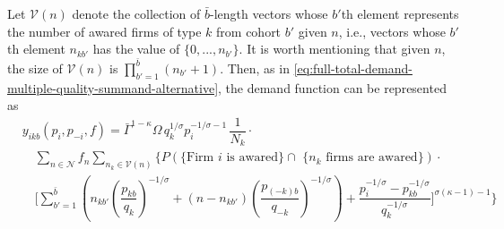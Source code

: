 \documentclass[12pt]{article}
\begin{document}
Let $\mathcal{V} (n)$ denote the collection of $\bar b$-length vectors whose $b'$th element represents the number of awared firms of type $k$ from cohort $b'$ given $n$, i.e., vectors whose $b'$th element $n_{kb'}$ has the value of $\{0,..., n_{b'} \}$. It is worth mentioning that given $n$, the size of $\mathcal{V} (n)$ is $\prod_{b'=1}^{\bar b} (n_{b'} + 1)$. Then, as in \eqref{eq:full-total-demand-multiple-quality-summand-alternative}, the demand function can be represented as
\begin{equation}\label{eq:full-total-demand-two-quality-multiple-cohort}
\begin{aligned}
& y_{ikb}(p_i, p_{-i}, f) 
=  \bar{\Gamma}^{1-\kappa}\Omega \, q_k^{1/\sigma}p_i^{-1/\sigma - 1}\, \dfrac{1}{N_k} \cdot  \\ 
& \quad \sum_{n \in \mathcal{N} } f_n   \sum_{n_k \in \mathcal{V} (n) }  
\Bigg\{
P( \text{\{Firm $i$ is awared\} $\cap$ \{$n_k$ firms are awared\}})
\cdot \\ & \quad
\Bigg[
\sum_{b' = 1}^{\bar b} 
\left(
n_{kb'} \left( \dfrac{p_{kb}}{q_{k}}   \right)^{-1/\sigma} +  
(n - n_{kb'}) \left( \dfrac{p_{(-k)b}}{q_{-k}}   \right)^{-1/\sigma} \right) + 
\dfrac{p_i^{-1/\sigma} - p^{-1/\sigma}_{kb} }{ q_k^{-1/\sigma }} 
\Bigg]^{\sigma (\kappa - 1)-1} \Bigg\}
\end{aligned}
\end{equation}
\end{document}
